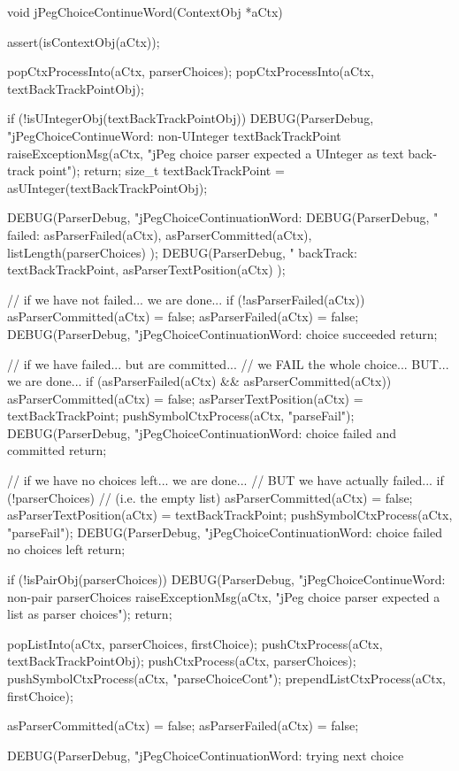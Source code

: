 \startCCode
void jPegChoiceContinueWord(ContextObj *aCtx) {
  assert(isContextObj(aCtx));
  
  popCtxProcessInto(aCtx, parserChoices);
  popCtxProcessInto(aCtx, textBackTrackPointObj);
  
  if (!isUIntegerObj(textBackTrackPointObj)) {
    DEBUG(ParserDebug,
      "jPegChoiceContinueWord: non-UInteger textBackTrackPoint%
    raiseExceptionMsg(aCtx,
      "jPeg choice parser expected a UInteger as text back-track point");
    return;
  }
  size_t textBackTrackPoint = asUInteger(textBackTrackPointObj);
  
  DEBUG(ParserDebug,
    "jPegChoiceContinuationWord:%
  DEBUG(ParserDebug,
    "  failed: %
    asParserFailed(aCtx), asParserCommitted(aCtx),
    listLength(parserChoices)
  );
  DEBUG(ParserDebug,
    "  backTrack: %
    textBackTrackPoint, asParserTextPosition(aCtx)
  );
  
  // if we have not failed... we are done...
  if (!asParserFailed(aCtx)) {
    asParserCommitted(aCtx) = false;
    asParserFailed(aCtx)    = false;
    DEBUG(ParserDebug, "jPegChoiceContinuationWord: choice succeeded%
    return;
  }

  // if we have failed... but are committed... 
  // we FAIL the whole choice... BUT... we are done...
  if (asParserFailed(aCtx) && asParserCommitted(aCtx)) {
    asParserCommitted(aCtx)    = false;
    asParserTextPosition(aCtx) = textBackTrackPoint;
    pushSymbolCtxProcess(aCtx, "parseFail");
    DEBUG(ParserDebug, "jPegChoiceContinuationWord: choice failed and committed%
    return;
  }

  // if we have no choices left... we are done...
  // BUT we have actually failed...
  if (!parserChoices) {    // (i.e. the empty list)
    asParserCommitted(aCtx)    = false;
    asParserTextPosition(aCtx) = textBackTrackPoint;
    pushSymbolCtxProcess(aCtx, "parseFail");
    DEBUG(ParserDebug, "jPegChoiceContinuationWord: choice failed no choices left%
    return;
  }

  if (!isPairObj(parserChoices)) {
    DEBUG(ParserDebug,
      "jPegChoiceContinueWord: non-pair parserChoices%
    raiseExceptionMsg(aCtx,
      "jPeg choice parser expected a list as parser choices");
    return;
  }

  popListInto(aCtx, parserChoices, firstChoice);
  pushCtxProcess(aCtx, textBackTrackPointObj);
  pushCtxProcess(aCtx, parserChoices);
  pushSymbolCtxProcess(aCtx, "parseChoiceCont");
  prependListCtxProcess(aCtx, firstChoice);
  
  asParserCommitted(aCtx) = false;
  asParserFailed(aCtx)    = false;
  
  DEBUG(ParserDebug, "jPegChoiceContinuationWord: trying next choice%
}
\stopCCode

